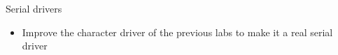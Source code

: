 \setuplabframe
{Serial drivers}
{
  \begin{itemize}
  \item Improve the character driver of the previous labs to make it a
    real serial driver
  \end{itemize}
}
